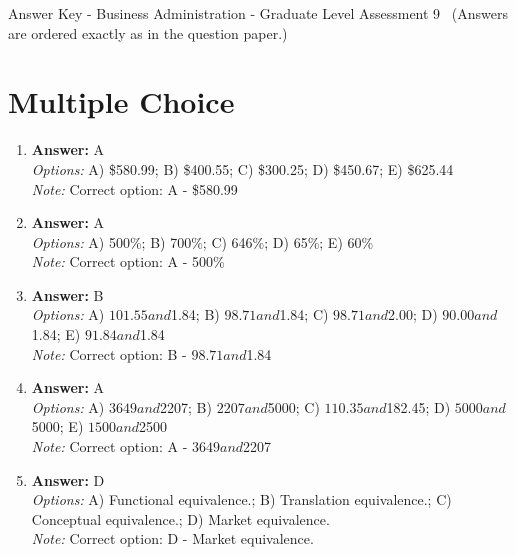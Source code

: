 \documentclass[12pt]{article}
\begin{document}
\begin{center}
Answer Key - Business Administration - Graduate Level Assessment 9 \
\small (Answers are ordered exactly as in the question paper.)
\end{center}

\section*{Multiple Choice}
\begin{enumerate}[label=\arabic*.]
\item \textbf{Answer:} A
\\ \textit{Options:} A) \$580.99; B) \$400.55; C) \$300.25; D) \$450.67; E) \$625.44
\\ \textit{Note:} Correct option: A - \$580.99
\item \textbf{Answer:} A
\\ \textit{Options:} A) 500\%; B) 700\%; C) 646\%; D) 65\%; E) 60\%
\\ \textit{Note:} Correct option: A - 500\%
\item \textbf{Answer:} B
\\ \textit{Options:} A) $101.55 and $1.84; B) $98.71 and $1.84; C) $98.71 and $2.00; D) $90.00 and $1.84; E) $91.84 and $1.84
\\ \textit{Note:} Correct option: B - $98.71 and $1.84
\item \textbf{Answer:} A
\\ \textit{Options:} A) $3649 and $2207; B) $2207 and $5000; C) $110.35 and $182.45; D) $5000 and $5000; E) $1500 and $2500
\\ \textit{Note:} Correct option: A - $3649 and $2207
\item \textbf{Answer:} D
\\ \textit{Options:} A) Functional equivalence.; B) Translation equivalence.; C) Conceptual equivalence.; D) Market equivalence.
\\ \textit{Note:} Correct option: D - Market equivalence.
\end{enumerate}
\end{document}
